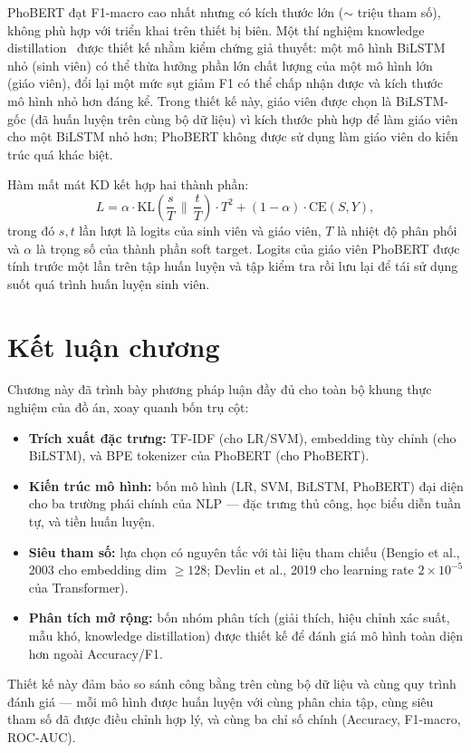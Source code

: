 PhoBERT đạt F1-macro cao nhất nhưng có kích thước lớn ($\sim$\phobertparams{} triệu tham số), không phù hợp với triển khai trên thiết bị biên. Một thí nghiệm knowledge distillation~\cite{hinton2015distill} được thiết kế nhằm kiểm chứng giả thuyết: một mô hình BiLSTM nhỏ (sinh viên) có thể thừa hưởng phần lớn chất lượng của một mô hình lớn (giáo viên), đổi lại một mức sụt giảm F1 có thể chấp nhận được và kích thước mô hình nhỏ hơn đáng kể. Trong thiết kế này, giáo viên được chọn là BiLSTM-gốc (đã huấn luyện trên cùng bộ dữ liệu) vì kích thước phù hợp để làm giáo viên cho một BiLSTM nhỏ hơn; PhoBERT không được sử dụng làm giáo viên do kiến trúc quá khác biệt.

Hàm mất mát KD kết hợp hai thành phần:
\[
L = \alpha \cdot \mathrm{KL}\!\left(\frac{s}{T} \,\big\|\, \frac{t}{T}\right) \cdot T^2
  + (1 - \alpha) \cdot \mathrm{CE}(S, Y),
\]
trong đó $s, t$ lần lượt là logits của sinh viên và giáo viên, $T$ là nhiệt độ phân phối và $\alpha$ là trọng số của thành phần soft target. Logits của giáo viên PhoBERT được tính trước một lần trên tập huấn luyện và tập kiểm tra rồi lưu lại để tái sử dụng suốt quá trình huấn luyện sinh viên.

\section{Kết luận chương}

Chương này đã trình bày phương pháp luận đầy đủ cho toàn bộ khung thực nghiệm của đồ án, xoay quanh bốn trụ cột:

\begin{itemize}[leftmargin=2em]
  \item \textbf{Trích xuất đặc trưng:} TF-IDF (cho LR/SVM), embedding tùy chỉnh (cho BiLSTM), và BPE tokenizer của PhoBERT (cho PhoBERT).
  \item \textbf{Kiến trúc mô hình:} bốn mô hình (LR, SVM, BiLSTM, PhoBERT) đại diện cho ba trường phái chính của NLP --- đặc trưng thủ công, học biểu diễn tuần tự, và tiền huấn luyện.
  \item \textbf{Siêu tham số:} lựa chọn có nguyên tắc với tài liệu tham chiếu (Bengio et al., 2003 cho embedding dim $\ge 128$; Devlin et al., 2019 cho learning rate $2 \times 10^{-5}$ của Transformer).
  \item \textbf{Phân tích mở rộng:} bốn nhóm phân tích (giải thích, hiệu chỉnh xác suất, mẫu khó, knowledge distillation) được thiết kế để đánh giá mô hình toàn diện hơn ngoài Accuracy/F1.
\end{itemize}

Thiết kế này đảm bảo so sánh công bằng trên cùng bộ dữ liệu và cùng quy trình đánh giá --- mỗi mô hình được huấn luyện với cùng phân chia tập, cùng siêu tham số đã được điều chỉnh hợp lý, và cùng ba chỉ số chính (Accuracy, F1-macro, ROC-AUC).

\clearpage
